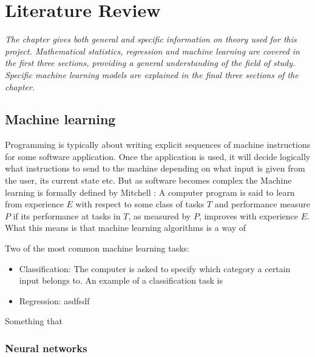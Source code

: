 \chapter{Literature Review}
\emph{The chapter gives both general and specific information on theory used for this project.  Mathematical statistics, regression and machine learning are covered in the first three sections, providing a general understanding of the field of study. Specific machine learning models are explained in the final three sections of the chapter. }


\section{Machine learning}
	Programming is typically about writing explicit sequences of machine instructions for some software application. Once the application is used, it will decide logically what instructions to send to the machine depending on what input is given from the user, its current state etc. But as software becomes complex the %
	Machine learning is formally defined by Mitchell \cite{BOOK:2}: 
	A computer program is said to learn from experience $E$ with respect to some class of tasks $T$ and performance measure $P$ if its performance at tasks in $T$, as measured by $P$, improves with experience $E$.
	What this means is that machine learning algorithms is a way of 
	
	Two of the most common machine learning tasks: 
	\begin{itemize}
		\item{Classification:} The computer is asked to specify which category a certain input belongs to. An example of a classification task is  
		\item{Regression:} asdfsdf
	\end{itemize} \cite{BOOK:1}
	Something that \cite{WEBSITE:1}
\subsection{Neural networks}

